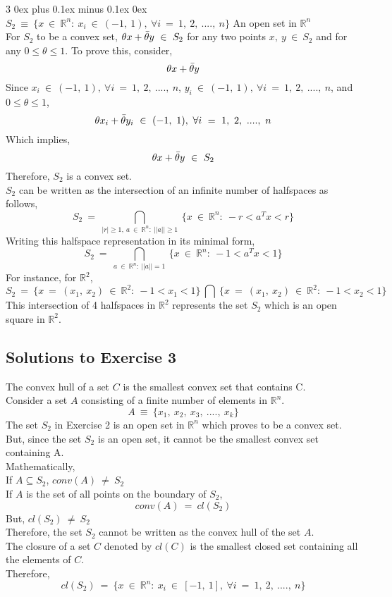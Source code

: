 \documentclass[12pt, draftcls, onecolumn]{IEEEtran}
\makeatletter
\def\subsubsection{\@startsection{subsubsection}%
                                 {3}%
                                 {\z@}%
                                 {0ex plus 0.1ex minus 0.1ex}%
                                 {0ex}%
                                 {\normalfont\normalsize\bfseries}}%
\makeatother
\begin{document}
\subsubsection{$S_2\ \equiv\ \{x\ \in\ \mathbb{R}^n:\ x_i\ \in\ (-1,\ 1),\ \forall i\ =\ 1,\ 2,\ ....,\ n\}$}
An open set in $\mathbb{R}^n$
\\For $S_2$ to be a convex set, $\theta x+\Bar{\theta} y\ \in\ S_2$ for any two points $x,\ y\ \in\ S_2$ and for any $0 \leq \theta \leq 1$.
To prove this, consider,
\[\theta x + \Bar{\theta} y\]
Since $x_i\ \in\ (-1,\ 1),\ \forall i\ =\ 1,\ 2,\ ....,\ n$, $y_i\ \in\ (-1,\ 1),\ \forall i\ =\ 1,\ 2,\ ....,\ n$, and $0 \leq \theta \leq 1$,
\[\theta x_i+ \Bar{\theta} y_i\ \in\ (-1,\ 1),\ \forall i\ =\ 1,\ 2,\ ....,\ n\]
Which implies,
\[\theta x+ \Bar{\theta} y\ \in\ S_2\]
Therefore, $S_2$ is a convex set.
\\$S_2$ can be written as the intersection of an infinite number of halfspaces as follows,
\[S_2\ =\ \bigcap_{|r| \geq 1,\ a\ \in\ \mathbb{R}^n:\ ||a|| \geq 1}\ \{x\ \in\ \mathbb{R}^n:\ -r < a^T x < r\}\]
Writing this halfspace representation in its minimal form,
\[S_2\ =\ \bigcap_{a\ \in\ \mathbb{R}^n:\ ||a|| = 1}\ \{x\ \in\ \mathbb{R}^n:\ -1 < a^T x < 1\}\]
For instance, for $\mathbb{R}^2$,
\[S_2\ =\ \{x\ =\ (x_1,\ x_2)\ \in\ \mathbb{R}^2:\ -1 < x_1 < 1\}\ \bigcap\ \{x\ =\ (x_1,\ x_2)\ \in\ \mathbb{R}^2:\ -1 < x_2 < 1\}\]
This intersection of 4 halfspaces in $\mathbb{R}^2$ represents the set $S_2$ which is an open square in $\mathbb{R}^2$.
\subsection{Solutions to Exercise 3}
The convex hull of a set $C$ is the smallest convex set that contains C.
\\Consider a set $A$ consisting of a finite number of elements in $\mathbb{R}^n$.
\[A\ \equiv\ \{x_1,\ x_2,\ x_3,\ ....,\ x_k\}\]
The set $S_2$ in Exercise 2 is an open set in $\mathbb{R}^n$ which proves to be a convex set.
\\But, since the set $S_2$ is an open set, it cannot be the smallest convex set containing A.
\\Mathematically,
\\If $A \subseteq S_2$, $conv(A)\ \neq\ S_2$
\\If $A$ is the set of all points on the boundary of $S_2$,
\[conv(A)\ =\ cl(S_2)\]
But, $cl(S_2)\ \neq\ S_2$
\\Therefore, the set $S_2$ cannot be written as the convex hull of the set $A$.
\\The closure of a set $C$ denoted by $cl(C)$ is the smallest closed set containing all the elements of $C$.
\\Therefore,
\[cl(S_2)\ =\ \{x\ \in\ \mathbb{R}^n:\ x_i\ \in\ [-1,\ 1],\ \forall i\ =\ 1,\ 2,\ ....,\ n\}\]
\end{document}
